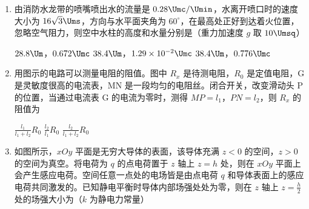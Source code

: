 \documentclass[\gkver]{gaokaozhenti}
\begin{document}
\begin{enumerate}
{正确选项：C。
}

\item
由消防水龙带的喷嘴喷出水的流量是 $0.28\Umc/\Umin$，水离开喷口时的速度大小为 $16\sqrt{3}\Ums$，方向与水平面夹角为 $60^{\circ}$，在最高处正好到达着火位置，忽略空气阻力，则空中水柱的高度和水量分别是（重力加速度 $g$ 取 $10\Umsq$）

{$28.8\Um$，$0.672\Umc$}
{$38.4\Um$，$1.29\times10^{-2}\Umc$}
{$38.4\Um$，$0.776\Umc$}


\item
用图示的电路可以测量电阻的阻值。图中 $R_{x}$ 是待测电阻，$R_{0}$ 是定值电阻，G 是灵敏度很高的电流表，MN 是一段均匀的电阻丝。闭合开关，改变滑动头 P 的位置，当通过电流表 G 的电流为零时，测得 $MP=l_{1}$，$PN=l_{2}$，则 $R_{x}$ 的阻值为


{$\frac{l_1}{l_1+l_2}R_{0}$}
{$\frac{l_2}{l_1}R_{0}$}
{$\frac{l_2}{l_1+l_2}R_{0}$}


\item
如图所示，$xOy$ 平面是无穷大导体的表面，该导体充满 $z<0$ 的空间，$z>0$ 的空间为真空。将电荷为 $q$ 的点电荷置于 $z$ 轴上 $z=h$ 处，则在 $xOy$ 平面上会产生感应电荷。空间任意一点处的电场皆是由点电荷 $q$ 和导体表面上的感应电荷共同激发的。已知静电平衡时导体内部场强处处为零，则在 $z$ 轴上 $z=\frac{h}{2}$ 处的场强大小为（$k$ 为静电力常量）


\end{enumerate}
\end{document}

